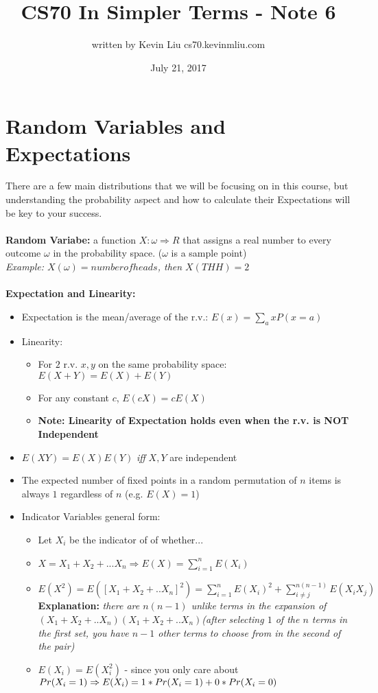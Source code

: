 \documentclass[a4paper]{article}
\title{CS70 In Simpler Terms - Note 6}
\author{written by Kevin Liu cs70.kevinmliu.com}
\date{July 21, 2017}
\begin{document}
\maketitle

\section{Random Variables and Expectations}
There are a few main distributions that we will be focusing on in this course, but understanding the probability aspect and how to calculate their Expectations will be key to your success.\\\\
\textbf{Random Variabe:} a function $X: \omega \Rightarrow R$ that assigns a real number to every outcome $\omega$ in the probability space. ($\omega$ is a sample point) \\
\indent \textit{Example: $X(\omega) = number of heads$, then $X(THH) = 2$}\\\\
\textbf{Expectation and Linearity:}
\begin{itemize}
    \item Expectation is the mean/average of the r.v.: $E(x)= \sum_a xP(x=a)$
    \item Linearity:
    \begin{itemize}
        \item For $2$ r.v. $x,y$ on the same probability space: $E(X+Y) = E(X) + E(Y)$
        \item For any constant $c$, $E(cX) = cE(X)$
        \item \textbf{Note: Linearity of Expectation holds even when the r.v. is NOT Independent}
    \end{itemize}
    \item $E(XY) = E(X)E(Y)$ \textit{iff} $X,Y$ are independent
    \item The expected number of fixed points in a random permutation of $n$ items is always $1$ regardless of $n$ (e.g. $E(X) = 1$)
    \item Indicator Variables general form:\\
    \begin{itemize}
        \item Let $X_i$ be the indicator of of whether...
        \item $X = X_1 + X_2 + ... X_n \Rightarrow E(X) = \sum_{i=1}^n E(X_i)$
        \item $E(X^2) = E([X_1 + X_2 + .. X_n]^2) = \sum_{i=1}^n E(X_i)^2 + \sum_{i\neq j}^{n(n-1)}E(X_i X_j)$ \textbf{Explanation:} \textit{there are $n(n-1)$ unlike terms in the expansion of $(X_1 + X_2 + .. X_n)(X_1 + X_2 + .. X_n)$(after selecting $1$ of the $n$ terms in the first set, you have $n-1$ other terms to choose from in the second of the pair)}
        \item $E(X_i) = E(X_i^2)$ - since you only care about $Pr(X_i=1) \Rightarrow \\E(X_i) = 1 * Pr(X_i = 1) + 0 * Pr(X_i = 0)$
        
    \end{itemize}

\end{itemize}
\end{document}

